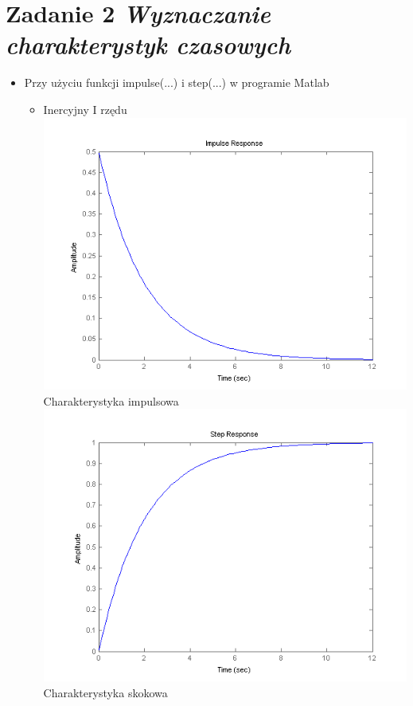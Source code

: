 \documentclass[a4paper,10pt]{article}
\begin{document}
\section{Zadanie 2 \textit{\small Wyznaczanie charakterystyk czasowych}}\label{sec:zad2}

\begin{itemize}
\item Przy użyciu funkcji impulse(...) i step(...) w programie Matlab
\begin{itemize}
\item Inercyjny I rzędu
\newline \includegraphics[scale=0.9]{CW1-inercyjny1-impuls}\newline Charakterystyka impulsowa
\newline \includegraphics[scale=0.9]{CW1-inercyjny1-skok}\newline Charakterystyka skokowa

\end{itemize}
\end{itemize}
\end{document}
